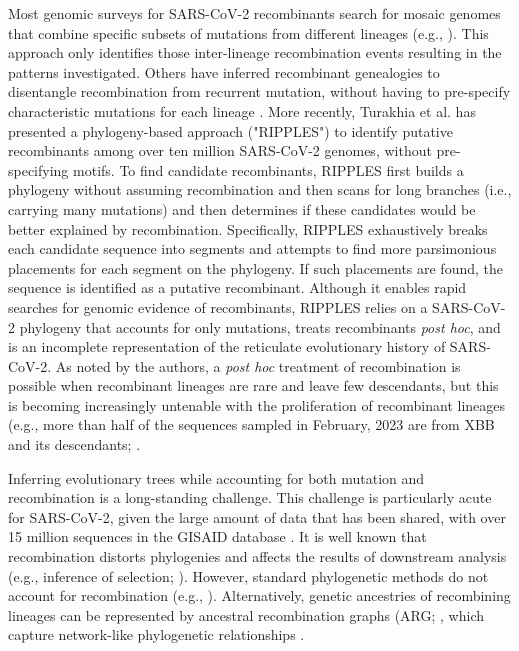 \documentclass{article}
\begin{document}
Most genomic surveys for SARS-CoV-2 recombinants search for mosaic genomes that combine specific subsets of mutations from different lineages (e.g., \cite{VanInsberghe2021-eu,Jackson2021-ik,Wertheim2022-hj,Sekizuka2022-xz}). This approach only identifies those inter-lineage recombination events resulting in the patterns investigated. Others have inferred recombinant genealogies to disentangle recombination from recurrent mutation, without having to pre-specify characteristic mutations for each lineage \cite{Ignatieva2021-rg}. More recently, Turakhia et al. \cite{Turakhia2022-it} has presented a phylogeny-based approach ("RIPPLES") to identify putative recombinants among over ten million SARS-CoV-2 genomes, without pre-specifying motifs. To find candidate recombinants, RIPPLES first builds a phylogeny without assuming recombination and then scans for long branches (i.e., carrying many mutations) and then determines if these candidates would be better explained by recombination. Specifically, RIPPLES exhaustively breaks each candidate sequence into segments and attempts to find more parsimonious placements for each segment on the phylogeny. If such placements are found, the sequence is identified as a putative recombinant. Although it enables rapid searches for genomic evidence of recombinants, RIPPLES relies on a SARS-CoV-2 phylogeny that accounts for only mutations, treats recombinants \textit{post hoc}, and is an incomplete representation of the reticulate evolutionary history of SARS-CoV-2. As noted by the authors, a \textit{post hoc} treatment of recombination is possible when recombinant lineages are rare and leave few descendants, but this is becoming increasingly untenable with the proliferation of recombinant lineages (e.g., more than half of the sequences sampled in February, 2023 are from XBB and its descendants; \cite{Chen2022-pz}.

Inferring evolutionary trees while accounting for both mutation and recombination is a long-standing challenge. This challenge is particularly acute for SARS-CoV-2, given the large amount of data that has been shared, with over 15 million sequences in the GISAID database \cite{Shu2017-hp}. It is well known that recombination distorts phylogenies \cite{Schierup2000-fg} and affects the results of downstream analysis (e.g., inference of selection; \cite{Anisimova2003-vr}). However, standard phylogenetic methods do not account for recombination (e.g., \cite{Ronquist2012-zw,Minh2020-lr,Guindon2003-zd}). Alternatively, genetic ancestries of recombining lineages can be represented by ancestral recombination graphs (ARG; \cite{Griffiths1981-lw,Hudson1983-if}, which  capture network-like phylogenetic relationships \cite{Gusfield2014-qw}.
\end{document}
